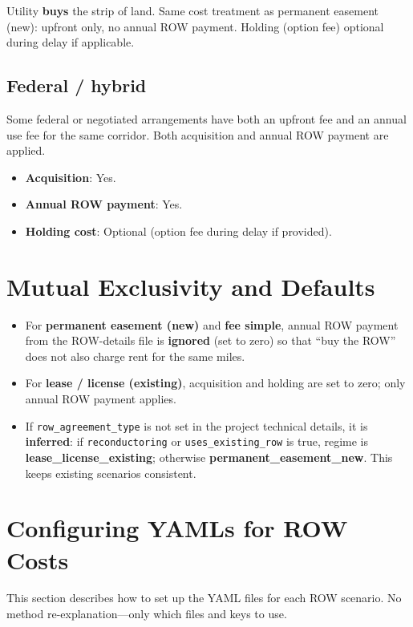 \documentclass[ctcc_full_documentation.tex]{subfiles}
\begin{document}
Utility \textbf{buys} the strip of land. Same cost treatment as permanent easement (new): upfront only, no annual ROW payment. Holding (option fee) optional during delay if applicable.

\subsection{Federal / hybrid}

Some federal or negotiated arrangements have both an upfront fee and an annual use fee for the same corridor. Both acquisition and annual ROW payment are applied.

\begin{itemize}
    \item \textbf{Acquisition}: Yes.
    \item \textbf{Annual ROW payment}: Yes.
    \item \textbf{Holding cost}: Optional (option fee during delay if provided).
\end{itemize}

\section{Mutual Exclusivity and Defaults}

\begin{itemize}
    \item For \textbf{permanent easement (new)} and \textbf{fee simple}, annual ROW payment from the ROW-details file is \textbf{ignored} (set to zero) so that ``buy the ROW'' does not also charge rent for the same miles.
    \item For \textbf{lease / license (existing)}, acquisition and holding are set to zero; only annual ROW payment applies.
    \item If \texttt{row\_agreement\_type} is not set in the project technical details, it is \textbf{inferred}: if \texttt{reconductoring} or \texttt{uses\_existing\_row} is true, regime is \textbf{lease\_license\_existing}; otherwise \textbf{permanent\_easement\_new}. This keeps existing scenarios consistent.
\end{itemize}

\section{Configuring YAMLs for ROW Costs}

This section describes how to set up the YAML files for each ROW scenario. No method re-explanation---only which files and keys to use.
\end{document}
